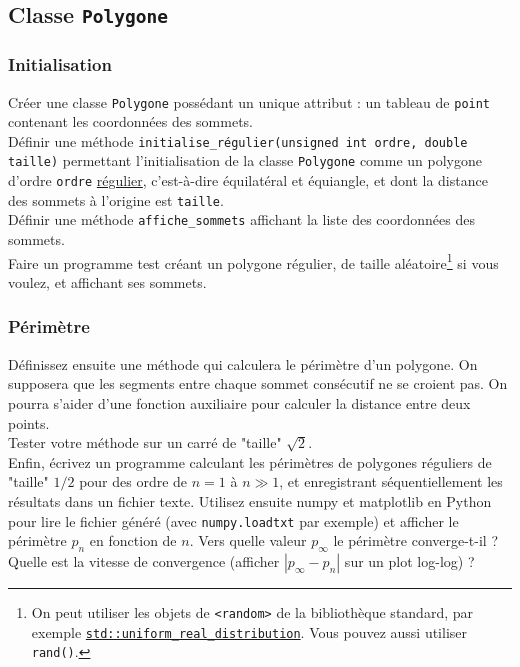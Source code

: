 \documentclass{book}
\newcommand{\inline}[1]{\texttt{#1}}
\begin{document}
\subsection{Classe \texttt{Polygone}}

\subsubsection{Initialisation}
Créer une classe \texttt{Polygone} possédant un unique attribut : un tableau de \texttt{point} contenant les coordonnées des sommets.\\

Définir une méthode \inline{initialise_régulier(unsigned int ordre, double taille)} permettant l'initialisation de la classe \texttt{Polygone} comme un polygone d'ordre \inline{ordre} \href{https://fr.wikipedia.org/wiki/Polygone_r%C3%A9gulier}{régulier}, c'est-à-dire équilatéral et équiangle, et dont la distance des sommets à l'origine est \texttt{taille}.\\

Définir une méthode \inline{affiche_sommets} affichant la liste des coordonnées des sommets.\\

Faire un programme test créant un polygone régulier, de taille aléatoire\footnote{On peut utiliser les objets de \texttt{<random>} de la bibliothèque standard, par exemple \href{https://en.cppreference.com/w/cpp/numeric/random/uniform_real_distribution}{\inline{std::uniform_real_distribution}}. Vous pouvez aussi utiliser \inline{rand()}.} si vous voulez, et affichant ses sommets.

\subsubsection{Périmètre}

Définissez ensuite une méthode qui calculera le périmètre d'un polygone. On supposera que les segments entre chaque sommet consécutif ne se croient pas. On pourra s'aider d'une fonction auxiliaire pour calculer la distance entre deux points.\\

Tester votre méthode sur un carré de "taille" $\sqrt{2}$.\\

Enfin, écrivez un programme calculant les périmètres de polygones réguliers de "taille" $1/2$ pour des ordre de $n=1$ à $n\gg 1$, et enregistrant séquentiellement les résultats dans un fichier texte. Utilisez ensuite numpy et matplotlib en Python pour lire le fichier généré (avec \texttt{numpy.loadtxt} par exemple) et afficher le périmètre $p_n$ en fonction de $n$. Vers quelle valeur $p_\infty$ le périmètre converge-t-il ? Quelle est la vitesse de convergence (afficher $|p_\infty-p_n|$ sur un plot log-log) ?
\end{document}
